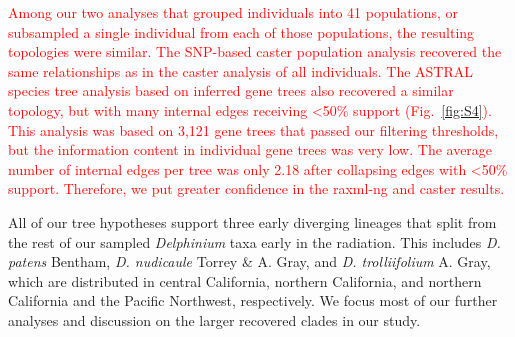 \documentclass[11pt]{article}
\begin{document}
\textcolor{red}{
Among our two analyses that grouped individuals into 41 populations, or 
subsampled a single individual from each of those populations, the resulting
topologies were similar. The SNP-based caster population analysis recovered the 
same relationships as in the caster analysis of all individuals. The ASTRAL species
tree analysis based on inferred gene trees also recovered a similar topology, but 
with many internal edges receiving <50\% support (Fig.~\ref{fig:S4}). 
This analysis was based on
3,121 gene trees that passed our filtering thresholds, but the information content
in individual gene trees was very low. The average number of internal edges per tree
was only 2.18 after collapsing edges with <50\% support. Therefore, we put greater 
confidence in the raxml-ng and caster results. 
}

All of our tree hypotheses support three early diverging lineages that split
from the rest of our sampled \emph{Delphinium} taxa early in the radiation. 
This includes \emph{D. patens} Bentham, \emph{D. nudicaule} Torrey \& A. Gray, and \emph{D. trolliifolium} A. Gray,
which are distributed in central California, northern California, and northern 
California and the Pacific Northwest, respectively. 
We focus most of our further
analyses and discussion on the larger recovered clades in our study.
\end{document}
